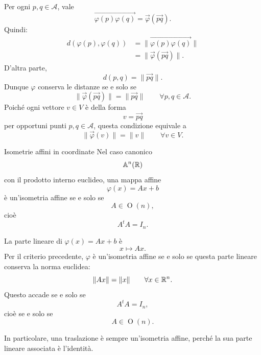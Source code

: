 \documentclass[a4paper]{article}
\begin{document}
\begin{snippetproof}{}
    Per ogni \(p,q\in\mathcal{A}\), vale
    \[
        \overrightarrow{\varphi(p)\varphi(q)}
        =
        \overrightarrow{\varphi}(\overrightarrow{pq}).
    \]
    Quindi:
    \begin{align*}
        d(\varphi(p),\varphi(q))
        &=
        \|\overrightarrow{\varphi(p)\varphi(q)}\|\\
        &=
        \|\overrightarrow{\varphi}(\overrightarrow{pq})\|.
    \end{align*}
    D'altra parte,
    \[
        d(p,q)=\|\overrightarrow{pq}\|.
    \]
    Dunque \(\varphi\) conserva le distanze se e solo se
    \[
        \|\overrightarrow{\varphi}(\overrightarrow{pq})\|
        =
        \|\overrightarrow{pq}\|
        \qquad
        \forall p,q\in\mathcal{A}.
    \]
    Poiché ogni vettore \(v\in V\) è della forma
    \[
        v=\overrightarrow{pq}
    \]
    per opportuni punti \(p,q\in\mathcal{A}\), questa condizione equivale a
    \[
        \|\overrightarrow{\varphi}(v)\|=\|v\|
        \qquad
        \forall v\in V.
    \]
\end{snippetproof}

\begin{snippetcorollary}{Isometrie affini in coordinate}
    Nel caso canonico
    \[
        \mathbb{A}^n(\mathbb{R})
    \]
    con il prodotto interno euclideo, una mappa affine
    \[
        \varphi(x)=Ax+b
    \]
    è un'isometria affine se e solo se
    \[
        A\in\operatorname{O}(n),
    \]
    cioè
    \[
        A^tA=I_n.
    \]
\end{snippetcorollary}

\begin{snippetproof}{}
    La parte lineare di \(\varphi(x)=Ax+b\) è
    \[
        x\mapsto Ax.
    \]
    Per il criterio precedente, \(\varphi\) è un'isometria affine se e solo se questa parte lineare conserva la norma euclidea:
    \[
        \|Ax\|=\|x\|
        \qquad
        \forall x\in\mathbb{R}^n.
    \]
    Questo accade se e solo se
    \[
        A^tA=I_n,
    \]
    cioè se e solo se
    \[
        A\in\operatorname{O}(n).
    \]
\end{snippetproof}

In particolare, una traslazione è sempre un'isometria affine, perché la sua parte lineare associata è l'identità.
\end{document}
